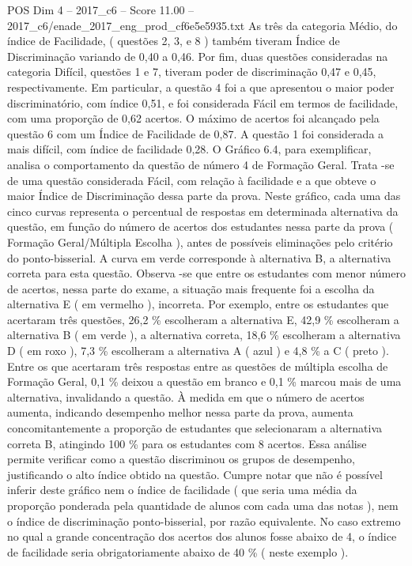 \begin{textsample}{POS Dim 4 – 2017\_c6 – Score 11.00 – 2017\_c6/enade\_2017\_eng\_prod\_cf6e5e5935.txt}
As três da categoria Médio, do índice de Facilidade, ( questões 2, 3, e 8 ) também tiveram Índice de Discriminação variando de 0,40 a 0,46.
Por fim, duas questões consideradas na categoria Difícil, questões 1 e 7, tiveram poder de discriminação 0,47 e 0,45, respectivamente.
Em particular, a questão 4 foi a que apresentou o maior poder discriminatório, com índice 0,51, e foi considerada Fácil em termos de facilidade, com uma proporção de 0,62 acertos.
O máximo de acertos foi alcançado pela questão 6 com um Índice de Facilidade de 0,87.
A questão 1 foi considerada a mais difícil, com índice de facilidade 0,28.
O Gráfico 6.4, para exemplificar, analisa o comportamento da questão de número 4 de Formação Geral.
Trata -se de uma questão considerada Fácil, com relação à facilidade e a que obteve o maior Índice de Discriminação dessa parte da prova.
Neste gráfico, cada uma das cinco curvas representa o percentual de respostas em determinada alternativa da questão, em função do número de acertos dos estudantes nessa parte da prova ( Formação Geral/Múltipla Escolha ), antes de possíveis eliminações pelo critério do ponto-bisserial.
A curva em verde corresponde à alternativa B, a alternativa correta para esta questão.
Observa -se que entre os estudantes com menor número de acertos, nessa parte do exame, a situação mais frequente foi a escolha da alternativa E ( em vermelho ), incorreta.
Por exemplo, entre os estudantes que acertaram três questões, 26,2 \% escolheram a alternativa E, 42,9 \% escolheram a alternativa B ( em verde ), a alternativa correta, 18,6 \% escolheram a alternativa D ( em roxo ), 7,3 \% escolheram a alternativa A ( azul ) e 4,8 \% a C ( preto ).
Entre os que acertaram três respostas entre as questões de múltipla escolha de Formação Geral, 0,1 \% deixou a questão em branco e 0,1 \% marcou mais de uma alternativa, invalidando a questão.
À medida em que o número de acertos aumenta, indicando desempenho melhor nessa parte da prova, aumenta concomitantemente a proporção de estudantes que selecionaram a alternativa correta B, atingindo 100 \% para os estudantes com 8 acertos.
Essa análise permite verificar como a questão discriminou os grupos de desempenho, justificando o alto índice obtido na questão.
Cumpre notar que não é possível inferir deste gráfico nem o índice de facilidade ( que seria uma média da proporção ponderada pela quantidade de alunos com cada uma das notas ), nem o índice de discriminação ponto-bisserial, por razão equivalente.
No caso extremo no qual a grande concentração dos acertos dos alunos fosse abaixo de 4, o índice de facilidade seria obrigatoriamente abaixo de 40 \% ( neste exemplo ).

\end{textsample}
